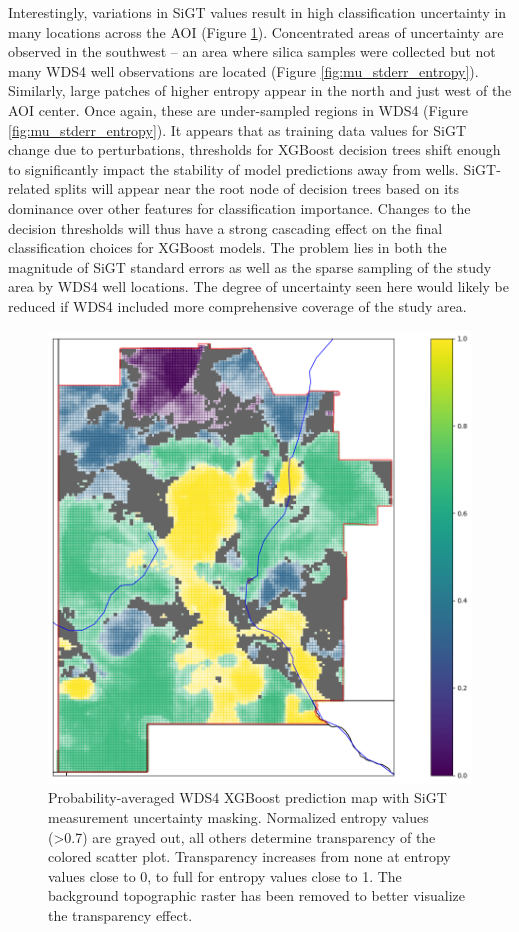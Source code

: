 Interestingly, variations in SiGT values result in high classification uncertainty in many locations across the AOI (Figure \ref{fig:mu_masked_pred_map}). Concentrated areas of uncertainty are observed in the southwest -- an area where silica samples were collected but not many WDS4 well observations are located (Figure \ref{fig:mu_stderr_entropy}). Similarly, large patches of higher entropy appear in the north and just west of the AOI center. Once again, these are under-sampled regions in WDS4 (Figure \ref{fig:mu_stderr_entropy}). It appears that as training data values for SiGT change due to perturbations, thresholds for XGBoost decision trees shift enough to significantly impact the stability of model predictions away from wells. SiGT-related splits will appear near the root node of decision trees based on its dominance over other features for classification importance. Changes to the decision thresholds will thus have a strong cascading effect on the final classification choices for XGBoost models. The problem lies in both the magnitude of SiGT standard errors as well as the sparse sampling of the study area by WDS4 well locations. The degree of uncertainty seen here would likely be reduced if WDS4 included more comprehensive coverage of the study area.

\begin{figure}[!htp]
\centering
\includegraphics[width=.8\textwidth]{templates/images/Figure-MU_Masked_Average_Gradient_Map.png}
\caption[SiGT measurement uncertainty mask on prediction map]
{Probability-averaged WDS4 XGBoost prediction map with SiGT measurement uncertainty masking. Normalized entropy values (>0.7) are grayed out, all others determine transparency of the colored scatter plot. Transparency increases from none at entropy values close to 0, to full for entropy values close to 1. The background topographic raster has been removed to better visualize the transparency effect.}
\label{fig:mu_masked_pred_map}
\end{figure}

